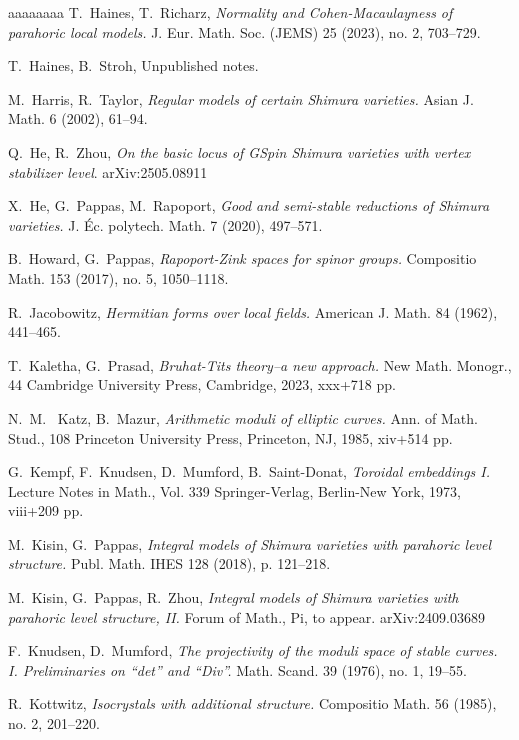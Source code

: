 \documentclass[reqno, 10pt]{amsart}
\theoremstyle{definition}
\numberwithin{equation}{subsection}
\numberwithin{subsubsection}{subsection}
\begin{document}
\begin{thebibliography}{aaaaaaaa}
 T.~Haines, T.~Richarz, \textit{Normality and Cohen-Macaulayness of parahoric local models.}
J. Eur. Math. Soc. (JEMS) 25 (2023), no. 2, 703--729.
 
  T.~Haines, B.~Stroh, Unpublished notes.
 
  M.~Harris,  R.~Taylor, \emph{Regular models of certain Shimura varieties.} Asian J. Math. 6 (2002), 61--94.
 
  Q.~He, R.~Zhou,  \textit{On the basic locus of GSpin Shimura varieties with vertex stabilizer level}. arXiv:2505.08911

 X.~He, G.~Pappas, M.~Rapoport, \textit{Good and semi-stable reductions of Shimura varieties.}
J. \'Ec. polytech. Math. 7 (2020), 497--571.

 B.~Howard, G.~Pappas, {\sl Rapoport-Zink spaces for spinor groups.}
  Compositio Math. 153 (2017), no. 5, 1050--1118.
        
 R.~Jacobowitz, \textit{Hermitian forms over local fields.}
 American J.  Math. 84 (1962), 441--465.
 


       T.~Kaletha, G.~Prasad,  \emph{Bruhat-Tits theory--a new approach.}
New Math. Monogr., 44
Cambridge University Press, Cambridge, 2023, xxx+718 pp.

        
     N.~M.~ Katz, B.~Mazur,   \textit{Arithmetic moduli of elliptic curves.}
Ann. of Math. Stud., 108
Princeton University Press, Princeton, NJ, 1985, xiv+514 pp.

   G.~Kempf, F.~Knudsen, D.~Mumford, B.~Saint-Donat, \emph{Toroidal embeddings I.}
Lecture Notes in Math., Vol. 339
Springer-Verlag, Berlin-New York, 1973, viii+209 pp.


  M.~Kisin, G.~Pappas, \emph{Integral models of Shimura varieties with parahoric level structure.}  Publ. Math. IHES 128 (2018), p. 121--218. 
 
  M.~Kisin, G.~Pappas, R.~Zhou, {\sl Integral models of Shimura varieties with parahoric level structure, II.} 
Forum of Math., Pi, to appear. arXiv:2409.03689 
 
 F.~Knudsen, D.~Mumford, \textit{The projectivity of the moduli space of stable curves. I. Preliminaries on ``det'' and ``Div''.}
Math. Scand. 39 (1976), no. 1, 19--55.


  R.~Kottwitz, \emph{Isocrystals with additional structure.}
Compositio Math. 56 (1985), no. 2, 201--220.


\end{thebibliography}
\end{document}

